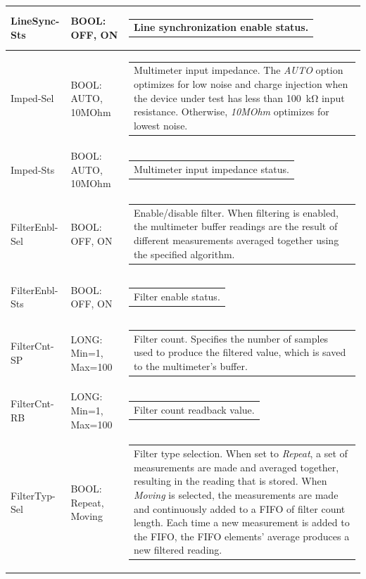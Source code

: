 \documentclass[openany]{article}
\begin{document}
\begin{longtable}{| m{3.0cm} m{4.5cm} m{7.0cm} |}
		LineSync-Sts & BOOL: OFF, ON & \begin{tabular}{@{}m{6cm}@{}}
	    					Line synchronization enable status.
						\end{tabular} \\ \hline
		Imped-Sel & BOOL: AUTO, 10MOhm & \begin{tabular}{@{}m{6cm}@{}}
	    					Multimeter input impedance. The \emph{AUTO} option optimizes for low noise and charge injection when the device under test has less than \SI{100}{\kohm} input resistance. Otherwise, \emph{10MOhm} optimizes for lowest noise.
						\end{tabular} \\ \hline
		Imped-Sts & BOOL: AUTO, 10MOhm & \begin{tabular}{@{}m{6cm}@{}}
	    					Multimeter input impedance status.
						\end{tabular} \\ \hline
		FilterEnbl-Sel & BOOL: OFF, ON & \begin{tabular}{@{}m{6cm}@{}}
	    					Enable/disable filter. When filtering is enabled, the multimeter buffer readings are the result of different measurements averaged together using the specified algorithm.
						\end{tabular} \\ \hline
		FilterEnbl-Sts & BOOL: OFF, ON & \begin{tabular}{@{}m{6cm}@{}}
	    					Filter enable status.
						\end{tabular} \\ \hline
		FilterCnt-SP & LONG: Min=1, Max=100 & \begin{tabular}{@{}m{6cm}@{}}
	    					Filter count. Specifies the number of samples used to produce the filtered value, which is saved to the multimeter's buffer.
						\end{tabular} \\ \hline
		FilterCnt-RB & LONG: Min=1, Max=100 & \begin{tabular}{@{}m{6cm}@{}}
	    					Filter count readback value.
						\end{tabular} \\ \hline
		FilterTyp-Sel & BOOL: Repeat, Moving & \begin{tabular}{@{}m{6cm}@{}}
	    					Filter type selection. When set to \emph{Repeat}, a set of measurements are made and averaged together, resulting in the reading that is stored. When \emph{Moving} is selected, the measurements are made and continuously added to a FIFO of filter count length. Each time a new measurement is added to the FIFO, the FIFO elements' average produces a new filtered reading.

\end{tabular}
\end{longtable}
\end{document}
